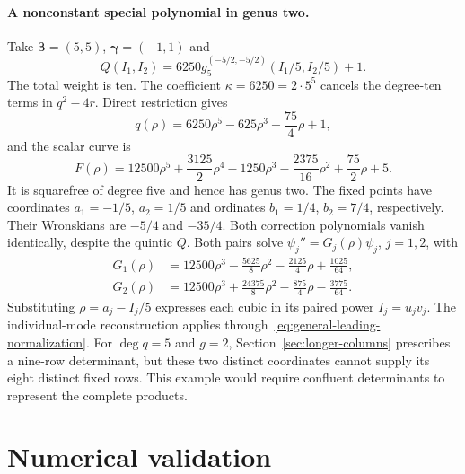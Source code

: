 \documentclass[11pt]{article}
\begin{document}
\paragraph{A nonconstant special polynomial in genus two.}

Take $\boldsymbol\beta=(5,5)$, $\boldsymbol\gamma=(-1,1)$ and
\begin{equation}\label{eq:nonconstant-Q}
 Q(I_1,I_2)=6250g_5^{(-5/2,-5/2)}(I_1/5,I_2/5)+1.
\end{equation}
The total weight is ten. The coefficient $\kappa=6250=2\cdot5^5$
cancels the degree-ten terms in $q^2-4r$. Direct restriction gives
\begin{equation}\label{eq:nonconstant-q}
 q(\rho)=6250\rho^5-625\rho^3+\frac{75}{4}\rho+1,
\end{equation}
and the scalar curve is
\begin{equation}\label{eq:nonconstant-F}
 F(\rho)=12500\rho^5+\frac{3125}{2}\rho^4-1250\rho^3
               -\frac{2375}{16}\rho^2+\frac{75}{2}\rho+5.
\end{equation}
It is squarefree of degree five and hence has genus two. The fixed points
have coordinates $a_1=-1/5$, $a_2=1/5$ and ordinates $b_1=1/4$,
$b_2=7/4$, respectively. Their Wronskians are $-5/4$ and $-35/4$.
Both correction polynomials vanish identically, despite the quintic $Q$.
Both pairs solve $\psi_j''=G_j(\rho)\psi_j$, $j=1,2$, with
\begin{equation}\label{eq:special-nonconstant-potentials}
 \begin{aligned}
 G_1(\rho)&=12500\rho^3-\frac{5625}{8}\rho^2
                         -\frac{2125}{4}\rho+\frac{1025}{64},\\
 G_2(\rho)&=12500\rho^3+\frac{24375}{8}\rho^2
                         -\frac{875}{4}\rho-\frac{3775}{64}.
 \end{aligned}
\end{equation}
Substituting $\rho=a_j-I_j/5$ expresses each cubic in its paired power
$I_j=u_jv_j$. The individual-mode reconstruction applies through~\eqref{eq:general-leading-normalization}.
For $\deg q=5$ and $g=2$, Section~\ref{sec:longer-columns} prescribes a nine-row determinant, but these two distinct coordinates cannot supply its eight distinct fixed rows. This example would require confluent determinants to represent the complete products.


\section{Numerical validation}\label{sec:numerical}
\end{document}
